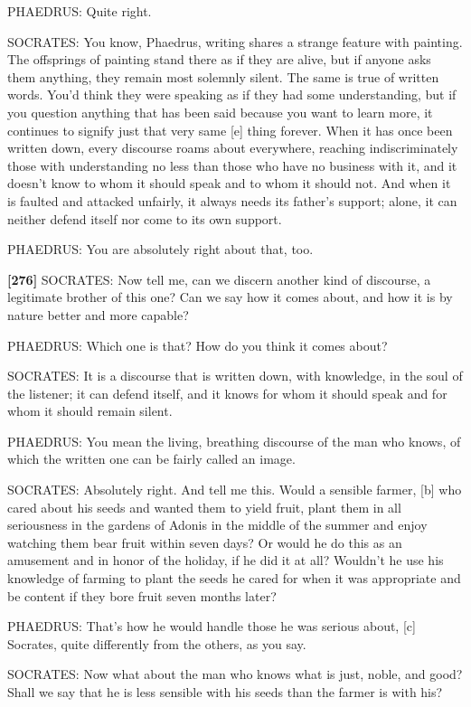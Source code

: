 PHAEDRUS: Quite right.

SOCRATES: You know, Phaedrus, writing shares a strange feature with
painting. The offsprings of painting stand there as if they are alive,
but if anyone asks them anything, they remain most solemnly silent. The
same is true of written words. You'd think they were speaking as if they
had some understanding, but if you question anything that has been said
because you want to learn more, it continues to signify just that very
same {[}e{]} thing forever. When it has once been written down, every
discourse roams about everywhere, reaching indiscriminately those with
understanding no less than those who have no business with it, and it
doesn't know to whom it should speak and to whom it should not. And when
it is faulted and attacked unfairly, it always needs its father's
support; alone, it can neither defend itself nor come to its own
support.

PHAEDRUS: You are absolutely right about that, too.

{\bf {[}276{]}} SOCRATES: Now tell me, can we discern another kind of
discourse, a legitimate brother of this one? Can we say how it comes
about, and how it is by nature better and more capable?

PHAEDRUS: Which one is that? How do you think it comes about?

SOCRATES: It is a discourse that is written down, with knowledge, in the
soul of the listener; it can defend itself, and it knows for whom it
should speak and for whom it should remain silent.

PHAEDRUS: You mean the living, breathing discourse of the man who knows,
of which the written one can be fairly called an image.

SOCRATES: Absolutely right. And tell me this. Would a sensible farmer,
{[}b{]} who cared about his seeds and wanted them to yield fruit, plant
them in all seriousness in the gardens of Adonis in the middle of the
summer and enjoy watching them bear fruit within seven days? Or would he
do this as an amusement and in honor of the holiday, if he did it at
all? Wouldn't he use
his knowledge of farming to plant the seeds he cared for when it was
appropriate and be content if they bore fruit seven months later?

PHAEDRUS: That's how he would handle those he was serious about, {[}c{]}
Socrates, quite differently from the others, as you say.

SOCRATES: Now what about the man who knows what is just, noble, and
good? Shall we say that he is less sensible with his seeds than the
farmer is with his?

